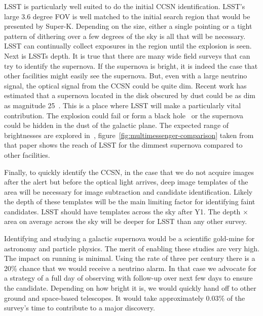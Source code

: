 \documentclass[11pt, letterpaper]{article}
\newcommand{\superk}  {Super\nobreakdash-K\xspace}
\begin{document}
LSST is particularly well suited to do the initial CCSN
identification.  LSST's large 3.6 degree FOV is well matched to the
initial search region that would be presented by \superk.  Depending
on the size, either a single pointing or a tight pattern of dithering
over a few degrees of the sky is all that will be necessary.  LSST can
continually collect exposures in the region until the explosion is
seen. Next is LSSTs depth. It is true that there are many wide field
surveys that can try to identify the supernova.  If the supernova is
bright, it is indeed the case that other facilities might easily see
the supernova.  But, even with a large neutrino signal, the optical
signal from the CCSN could be quite dim.  Recent work has estimated
that a supernova located in the disk obscured by dust could be as dim
as magnitude 25~\cite{2016MNRAS.461.3296N}.  This is a place where
LSST will make a particularly vital contribution.  The explosion could
fail or form a black hole~\cite{2011ApJ...730...70O,
  2017hsn..book.1555O} or the supernova could be hidden in the dust of
the galactic plane.  The expected range of brightnesses are explored
in~\cite{2016MNRAS.461.3296N},
figure~\ref{fig:multimessenger-comparison} taken from that paper shows
the reach of LSST for the dimmest supernova compared to other
facilities.

Finally, to quickly identify the CCSN, in the case that we do not
acquire images after the alert but before the optical light arrives,
deep image templates of the area will be necessary for image
subtraction and candidate identification.  Likely the depth of these
templates will be the main limiting factor for identifying faint
candidates.  LSST should have templates across the sky after Y1.  The
depth $\times$ area on average across the sky will be deeper for LSST
than any other survey.

Identifying and studying a galactic supernova would be a scientific
gold-mine for astronomy and particle physics.  The merit of enabling
these studies are very high. The impact on running is minimal.  Using
the rate of three per century there is a 20\% chance that we would
receive a neutrino alarm. In that case we advocate for a strategy of a
full day of observing with follow-up over next few days to ensure the
candidate.  Depending on how bright it is, we would quickly hand off
to other ground and space-based telescopes.  It would take
approximately 0.03\% of the survey's time to contribute to a major
discovery.

\clearpage
\end{document}
